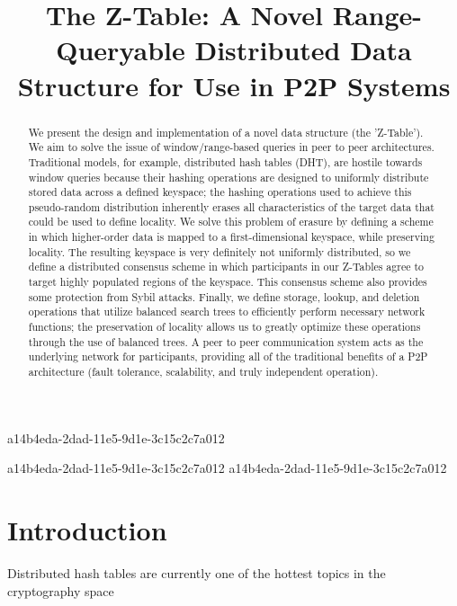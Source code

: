 \documentclass[12pt]{article}
\title{The Z-Table: A Novel Range-Queryable Distributed Data Structure for Use in P2P Systems}
\begin{document}
a14b4eda-2dad-11e5-9d1e-3c15c2c7a012\maketitle
a14b4eda-2dad-11e5-9d1e-3c15c2c7a012
a14b4eda-2dad-11e5-9d1e-3c15c2c7a012\begin{abstract}
We present the design and implementation of a novel data structure (the 'Z-Table'). We aim to solve the issue of window/range-based queries in peer to peer architectures. Traditional models, for example,  distributed hash tables (DHT), are hostile towards window queries because their hashing operations are designed to uniformly distribute stored data across a defined keyspace; the hashing operations used to achieve this pseudo-random distribution inherently erases all characteristics of the target data that could be used to define locality. We solve this problem of erasure by defining a scheme in which higher-order data is mapped to a first-dimensional keyspace, while preserving locality. The resulting keyspace is very definitely not uniformly distributed, so we define a distributed consensus scheme in which participants in our Z-Tables agree to target highly populated regions of the keyspace. This consensus scheme also provides some protection from Sybil attacks. Finally, we define storage, lookup, and deletion operations that utilize balanced search trees to efficiently perform necessary network functions; the preservation of locality allows us to greatly optimize these operations through the use of balanced trees. A peer to peer communication system acts as the underlying network for participants, providing all of the traditional benefits of a P2P architecture (fault tolerance, scalability, and truly independent operation).
\end{abstract}


\newpage
\section{Introduction}
Distributed hash tables are currently one of the hottest topics in the cryptography space~\cite{Stoica:2001dj,Rowstron:2001ea,Ratnasamy:2001wn}

\printbibliography
\end{document}
